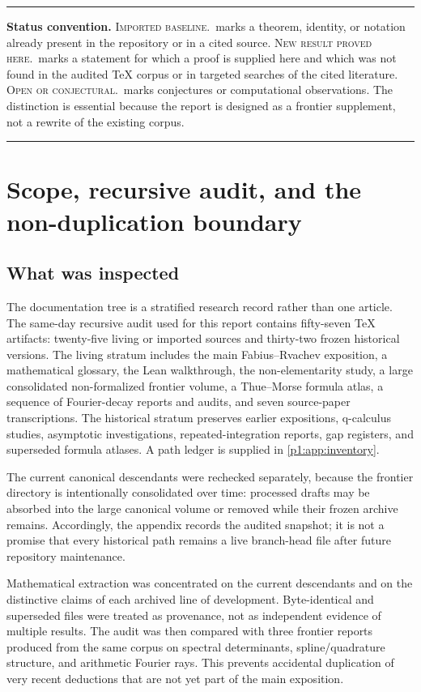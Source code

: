 \documentclass[11pt,oneside]{article}
\theoremstyle{definition}
\theoremstyle{remark}
\newcommand{\newresult}{\textcolor{newgreen}{\textsc{New result proved here.}}}
\newcommand{\imported}{\textcolor{importblue}{\textsc{Imported baseline.}}}
\newcommand{\openstatus}{\textcolor{conjectureorange}{\textsc{Open or conjectural.}}}
\newenvironment{boxedremark}{\par\smallskip\noindent\begin{center}\begin{minipage}{0.94\textwidth}\hrule\vspace{0.6em}\small}{\vspace{0.6em}\hrule\end{minipage}\end{center}\smallskip}
\begin{document}
\begin{boxedremark}
\textbf{Status convention.}
\imported\ marks a theorem, identity, or notation already present in the
repository or in a cited source.  \newresult\ marks a statement for which a
proof is supplied here and which was not found in the audited TeX corpus or in
targeted searches of the cited literature.  \openstatus\ marks conjectures or
computational observations.  The distinction is essential because the report
is designed as a frontier supplement, not a rewrite of the existing corpus.
\end{boxedremark}


\newpage

\section{Scope, recursive audit, and the non-duplication boundary}\label{p1:sec:scope}

\subsection{What was inspected}

The documentation tree is a stratified research record rather than one article.
The same-day recursive audit used for this report contains fifty-seven TeX
artifacts: twenty-five living or imported sources and thirty-two frozen historical
versions.  The living stratum includes the main Fabius--Rvachev exposition, a
mathematical glossary, the Lean walkthrough, the non-elementarity study, a
large consolidated non-formalized frontier volume, a Thue--Morse formula atlas,
a sequence of Fourier-decay reports and audits, and seven source-paper
transcriptions.  The historical stratum preserves earlier expositions, q-calculus
studies, asymptotic investigations, repeated-integration reports, gap registers,
and superseded formula atlases.  A path ledger is supplied in
\cref{p1:app:inventory}.

The current canonical descendants were rechecked separately, because the
frontier directory is intentionally consolidated over time: processed drafts
may be absorbed into the large canonical volume or removed while their frozen
archive remains.  Accordingly, the appendix records the audited snapshot; it is
not a promise that every historical path remains a live branch-head file after
future repository maintenance.

Mathematical extraction was concentrated on the current descendants and on the
distinctive claims of each archived line of development.  Byte-identical and
superseded files were treated as provenance, not as independent evidence of
multiple results.  The audit was then compared with three frontier reports
produced from the same corpus on spectral determinants, spline/quadrature
structure, and arithmetic Fourier rays.  This prevents accidental duplication
of very recent deductions that are not yet part of the main exposition.
\end{document}
